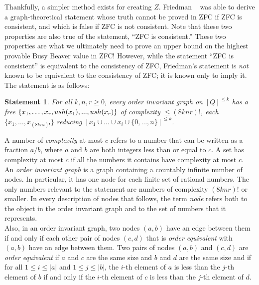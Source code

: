 \documentclass[11pt]{report}
\newtheorem{statement}{Statement}
\begin{document}
Thankfully, a simpler method exists for creating $Z$. Friedman \cite{friedman}~
was able to derive a graph-theoretical statement whose truth cannot be proved in ZFC if ZFC is consistent, and which is false if ZFC is not consistent. Note that these two properties are also true of the statement, ``ZFC is consistent.'' These two properties are what we ultimately need to prove an upper bound on the highest provable Busy Beaver value in ZFC! However, while the statement ``ZFC is consistent'' is equivalent to the consistency of ZFC, Friedman's statement is \emph{not} known to be equivalent to the consistency of ZFC; it is known only to imply it. The statement is as follows: \\

\begin{statement} \label{eq:friedman}
For all $k, n, r \ge 0$, every order invariant graph on $[Q]^{\le k}$ has a free $\{x_1,\dots,x_r, \\
ush(x_1),...,ush(x_r)\}$ of complexity $\le (8knr)!$, each $\{x_1, \dots, x_{(8kni)!}\}$
reducing $[x_1 \cup \dots \cup x_i \cup \{0,\dots,n\}]^{\le k}$. \cite{friedman}
\end{statement}

A number of \emph{complexity} at most $c$ refers to a number that can be written as a fraction $a/b$, where $a$ and $b$ are both integers less than or equal to $c$. A set has complexity at most $c$ if all the numbers it contains have complexity at most $c$. \\ 

An \emph{order invariant graph} is a graph containing a countably infinite number of nodes. In particular, it has one node for each finite set of rational numbers. The only numbers relevant to the statement are numbers of complexity $(8knr)!$ or smaller. In every description of nodes that follows, the term \emph{node} refers both to the object in the order invariant graph and to the set of numbers that it represents. \\

Also, in an order invariant graph, two nodes $(a,b)$ have an edge between them if and only if each other pair of nodes $(c,d)$ that is \emph{order equivalent} with $(a,b)$ have an edge between them. Two pairs of nodes $(a, b)$ and $(c, d)$ are \emph{order equivalent} if $a$ and $c$ are the same size and $b$ and $d$ are the same size and if for all $1 \le i \le |a|$ and $1 \le j \le |b|$, the $i$-th element of $a$ is less than the $j$-th element of $b$ if and only if the $i$-th element of $c$ is less than the $j$-th element of $d$. \\
\end{document}
